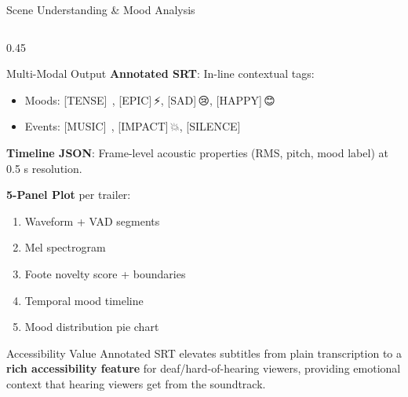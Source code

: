 \documentclass[aspectratio=169]{beamer}
\begin{document}
\begin{frame}{Scene Understanding \& Mood Analysis}
\begin{columns}[T]
\begin{column}{0.45\textwidth}
\begin{block}{Multi-Modal Output}
        \textbf{Annotated SRT}: In-line contextual tags:
        \begin{itemize}
          \item Moods: [TENSE]\,\textrm{😬}, [EPIC]\,\textrm{⚡}, [SAD]\,\textrm{😢}, [HAPPY]\,\textrm{😊}
          \item Events: [MUSIC]\,\textrm{🎵}, [IMPACT]\,\textrm{💥}, [SILENCE]
        \end{itemize}

        \textbf{Timeline JSON}: Frame-level acoustic properties (RMS, pitch, mood label) at 0.5 s resolution.

        \textbf{5-Panel Plot} per trailer:
        \begin{enumerate}
          \item Waveform + VAD segments
          \item Mel spectrogram
          \item Foote novelty score + boundaries
          \item Temporal mood timeline
          \item Mood distribution pie chart
        \end{enumerate}
      \end{block}
      \begin{alertblock}{Accessibility Value}
        Annotated SRT elevates subtitles from plain transcription to a \textbf{rich accessibility feature} for deaf/hard-of-hearing viewers, providing emotional context that hearing viewers get from the soundtrack.
      \end{alertblock}
    \end{column}
  \end{columns}
\end{frame}

\end{document}
